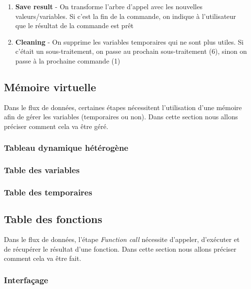 \documentclass[french]{article}
\begin{document}
\begin{enumerate}
\begin{enumerate}
\begin{itemize}
					\end{itemize}
					\item \textbf{Save result} - On transforme l'arbre d'appel avec les nouvelles valeurs/variables. Si c'est la fin de la commande, on indique à l'utilisateur que le résultat de la commande est prêt
					\item \textbf{Cleaning} - On supprime les variables temporaires qui ne sont plus utiles. Si c'était un sous-traitement, on passe au prochain sous-traitement (6), sinon on passe à la prochaine commande (1)
				\end{enumerate}
			\end{enumerate}
			
			\subsection{Mémoire virtuelle} 
			\label{subsec:memoire-virtuelle}
			Dans le flux de données, certaines étapes nécessitent l'utilisation d'une mémoire afin de gérer les variables (temporaires ou non). Dans cette section nous allons préciser comment cela va être géré.
			
			\subsubsection{Tableau dynamique hétérogène}
			
			\subsubsection{Table des variables}
			\label{subsubsec:table-des-variables}
			
			\subsubsection{Table des temporaires}
			\label{subsubsec:table-des-temporaires}
			
			\subsection{Table des fonctions}
			Dans le flux de données, l'étape \textit{Function call} nécessite d'appeler, d'exécuter et de récupérer le résultat d'une fonction. Dans cette section nous allons préciser comment cela va être fait.
			
			\subsubsection{Interfaçage}
			\label{subsubsec:interfacage}
			
\end{document}

